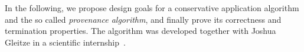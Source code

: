 In the following, we propose design goals for a conservative application algorithm and the so called \emph{provenance algorithm}, and finally prove its correctness and termination properties.
The algorithm was developed together with Joshua Gleitze in a scientific internship~.






